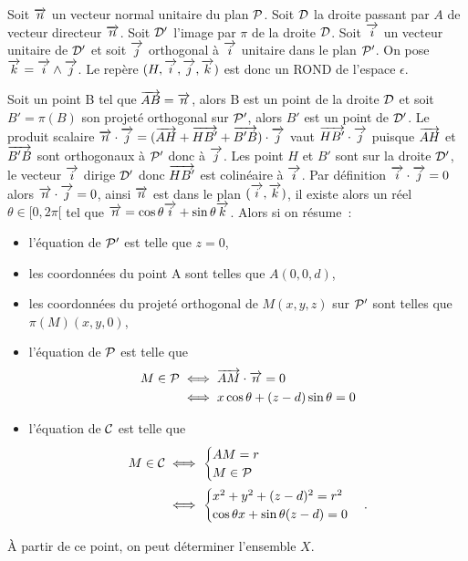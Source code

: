 Soit $\vn$ un vecteur normal unitaire du plan $\P$. Soit $\Dr$ la droite passant par $A$ de vecteur directeur $\vn$. Soit $\Dr'$ l'image par $\pi$ de la droite $\Dr$. Soit $\vi$ un vecteur unitaire de $\Dr'$ et soit $\vj$ orthogonal à $\vi$ unitaire dans le plan $\P'$. On pose $\vk=\vi\wedge \vj$. Le repère $(H,\vi,\vj,\vk)$ est donc un ROND de l'espace $\epsilon$.

Soit un point B tel que $\vect{AB}=\vn$, alors B est un point de la droite $\Dr$ et soit $B'=\pi(B)$ son projeté orthogonal sur $\P'$, alors $B'$ est un point de $\Dr'$. Le produit scalaire $\vn\cdot\vj=(\vect{AH}+\vect{HB'}+\vect{B'B})\cdot\vj$ vaut $\vect{HB'}\cdot\vj$ puisque $\vect{AH}$ et $\vect{B'B}$ sont orthogonaux à $\P'$ donc à $\vj$. Les point $H$ et $B'$ sont sur la droite $\Dr'$, le vecteur $\vi$ dirige $\Dr'$ donc $\vect{HB'}$ est colinéaire à $\vi$. Par définition $\vi\cdot \vj=0$ alors $\vn\cdot \vj=0$, ainsi $\vn$ est dans le plan $(\vi,\vk)$, il existe alors un réel $\theta\in[0,2\pi[$ tel que $\vn=\cos\theta\vi+\sin\theta\vk$. Alors si on résume~:
\begin{itemize}
\item l'équation de $\P'$ est telle que $z=0$,
\item les coordonnées du point A sont telles que $A(0,0,d)$,
\item les coordonnées du projeté orthogonal de $M(x,y,z)$ sur $\P'$ sont telles que $\pi(M)(x,y,0)$,
\item l'équation de $\P$ est telle que 
  \begin{align}
    M\in\P &\iff \vect{AM}\cdot\vn=0\\ &\iff x\cos\theta+(z-d)\sin\theta=0
  \end{align}
\item l'équation de $\courbe$ est telle que 
  \begin{align}
    M\in\courbe &\iff \begin{cases} AM=r\\M\in\P \end{cases}\\
    &\iff \begin{cases} x^2+y^2+(z-d)^2=r^2\\ \cos\theta x+\sin\theta (z-d)=0\end{cases}.
  \end{align}
\end{itemize}
À partir de ce point, on peut déterminer l'ensemble $X$.

